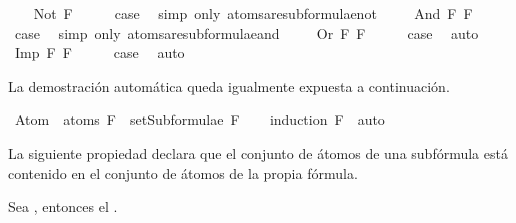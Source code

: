 \begin{isabellebody}
\isanewline
\ \ \isamarkupfalse%
\ {\isacharparenleft}Not\ F{\isacharparenright}\isanewline
\ \ \isamarkupfalse%
\ \isamarkupfalse%
\ {\isacharquery}case\ \isamarkupfalse%
\ {\isacharparenleft}simp\ only{\isacharcolon}\ atoms{\isacharunderscore}are{\isacharunderscore}subformulae{\isacharunderscore}not{\isacharparenright}\ \isanewline
{}\isamarkupfalse%
\isanewline
\ \ \isamarkupfalse%
\ {\isacharparenleft}And\ F{}\ F{}{\isacharparenright}\isanewline
\ \ \isamarkupfalse%
\ \isamarkupfalse%
\ {\isacharquery}case\ \isamarkupfalse%
\ {\isacharparenleft}simp\ only{\isacharcolon}\ atoms{\isacharunderscore}are{\isacharunderscore}subformulae{\isacharunderscore}and{\isacharparenright}\ \isanewline
{}\isamarkupfalse%
\isanewline
\ \ \isamarkupfalse%
\ {\isacharparenleft}Or\ F{}\ F{}{\isacharparenright}\isanewline
\ \ \isamarkupfalse%
\ \isamarkupfalse%
\ {\isacharquery}case\ \isamarkupfalse%
\ auto\isanewline
{}\isamarkupfalse%
\isanewline
\ \ \isamarkupfalse%
\ {\isacharparenleft}Imp\ F{}\ F{}{\isacharparenright}\isanewline
\ \ \isamarkupfalse%
\ \isamarkupfalse%
\ {\isacharquery}case\ \isamarkupfalse%
\ auto\isanewline
{}\isamarkupfalse%
%
\endisatagproof
{\isafoldproof}%
%
\isadelimproof
%
\endisadelimproof
%
\begin{isamarkuptext}%
La demostración automática queda igualmente expuesta a continuación.%
\end{isamarkuptext}\isamarkuptrue%
\isamarkupfalse%
\ {\isachardoublequoteopen}Atom\ {\isacharbackquote}\ atoms\ F\ {\isasymsubseteq}\ setSubformulae\ F{\isachardoublequoteclose}\isanewline
%
\isadelimproof
\ \ %
\endisadelimproof
%
\isatagproof
{}\isamarkupfalse%
\ {\isacharparenleft}induction\ F{\isacharparenright}\ \ auto%
\endisatagproof
{\isafoldproof}%
%
\isadelimproof
%
\endisadelimproof
%
\begin{isamarkuptext}%
La siguiente propiedad declara que el conjunto de átomos de una subfórmula está contenido 
  en el conjunto de átomos de la propia fórmula.
  \begin{lema}
    Sea , entonces el .
  \end{lema}


\end{isamarkuptext}
\end{isabellebody}
